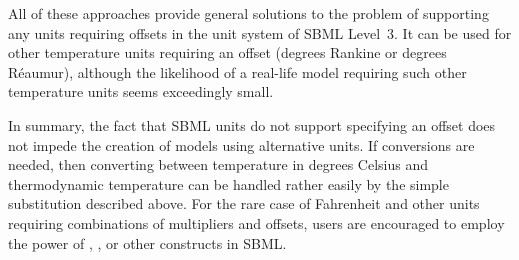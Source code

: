 All of these approaches provide general solutions to the problem
of supporting any units requiring offsets in the unit system of
SBML Level~3.  It can be used for other temperature units
requiring an offset (\eg degrees Rankine or degrees R\'{e}aumur),
although the likelihood of a real-life model requiring such other
temperature units seems exceedingly small.

In summary, the fact that SBML units do not support specifying an
offset does not impede the creation of models using alternative
units.  If conversions are needed, then converting between
temperature in degrees Celsius and thermodynamic temperature can
be handled rather easily by the simple substitution described
above.  For the rare case of Fahrenheit and other units requiring
combinations of multipliers and offsets, users are encouraged to
employ the power of \FunctionDefinition, \AssignmentRule, or other
constructs in SBML.





